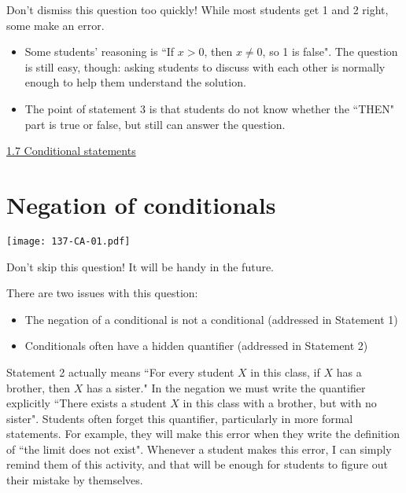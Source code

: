 \documentclass[11pt]{article}
\newcommand{\n}{\newpage}
\newcommand{\nl}{\hfill \vspace{-1.1\baselineskip}} %
\newcommand{\vseven}{\hspace{8mm} \href{https://www.youtube.com/watch?v=VPzlj_OJyU0&list=PLlwePzQY_wW-CPzhk-af-MXj9knthD1gx&index=7}{1.7 Conditional statements}}
\begin{document}
\begin{warning}
	Don't dismiss this question too quickly!  While most students get 1 and 2 right, some make an error. 
\end{warning}

\begin{comments}
\nl
\begin{itemize}
	\item Some students' reasoning is ``If $x>0$, then $x \neq 0$, so 1 is false".   The question is still easy, though: asking students to discuss with each other is normally enough to help them understand the solution.
	\item  The point of statement 3 is that students do not know whether the ``THEN" part is true or false, but still can answer the question.
\end{itemize}
\end{comments}

\begin{videos}
\vseven
\end{videos}

\n
\newpage
\section{Negation of conditionals} 

\begin{center}
{ \texttt{[image: 137-CA-01.pdf]}}
\end{center}

\begin{warning}
Don't skip this question!  It will be handy in the future.
\end{warning}

\begin{comments}
There are two issues with this question:
	\begin{itemize}
		 \item The negation of a conditional is not a conditional (addressed in Statement 1)
		 \item Conditionals often have a hidden quantifier (addressed in Statement 2)
	\end{itemize}		 
		 Statement 2 actually means ``For every student $X$ in this class, if $X$ has a brother, then $X$ has a sister."  In the negation we must write the quantifier explicitly ``There exists a student $X$ in this class with a brother, but with no sister".
		Students often forget this quantifier, particularly in more formal statements.  For example, they will make this error when they write the definition of ``the limit does not exist".    Whenever a student makes this error, I can simply remind them of this activity, and that will be enough for students to figure out their mistake by themselves.

\end{comments}
\end{document}
